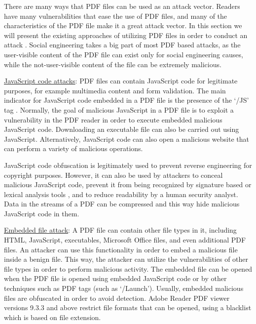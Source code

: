 \documentclass{article}
\begin{document}
\indent There are many ways that PDF files can be used as an attack vector. Readers have many vulnerabilities that ease the use of PDF files, and many of the characteristics of the PDF file make it a great attack vector. In this section we will present the existing approaches of utilizing PDF files in order to conduct an attack \cite{BGU2014malicious}. Social engineering takes a big part of most PDF based attacks, as the user-visible content of the PDF file can exist only for social engineering causes, while the not-user-visible content of the file can be extremely malicious.

\indent \underline{JavaScript code attacks}: PDF files can contain JavaScript code for legitimate purposes, for example multimedia content and form validation. The main indicator for JavaScript code embedded in a PDF file is the presence of the ‘/JS’ tag \cite{1} \cite{JSSrndic2011Laskov} \cite{Bonan2018ML} \cite{JAST2018}. Normally, the goal of malicious JavaScript in a PDF file is to exploit a vulnerability in the PDF reader in order to execute embedded malicious JavaScript code. Downloading an executable file can also be carried out using JavaScript. Alternatively, JavaScript code can also open a malicious website that can perform a variety of malicious operations.

\indent JavaScript code obfuscation is legitimately used to prevent reverse engineering for copyright purposes. However, it can also be used by attackers to conceal malicious JavaScript code, prevent it from being recognized by signature based or lexical analysis tools \cite{JSSrndic2011Laskov}, and to reduce readability by a human security analyst. Data in the streams of a PDF can be compressed and this way hide malicious JavaScript code in them.

\indent \underline{Embedded file attack}: A PDF file can contain other file types in it, including HTML, JavaScript, executables, Microsoft Office files, and even additional PDF files. An attacker can use this functionality in order to embed a malicious file inside a benign file. This way, the attacker can utilize the vulnerabilities of other file types in order to perform malicious activity. The embedded file can be opened when the PDF file is opened using embedded JavaScript code or by other techniques such as PDF tags (such as ‘/Launch’). Usually, embedded malicious files are obfuscated in order to avoid detection. Adobe Reader PDF viewer versions 9.3.3 and above restrict file formats that can be opened, using a blacklist which is based on file extension.
\end{document}
